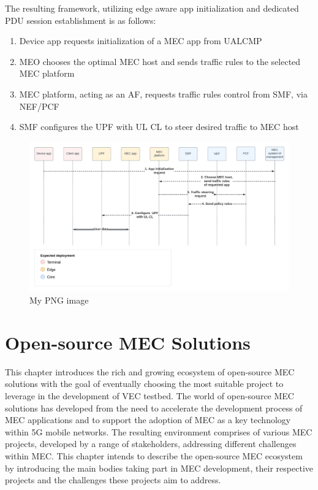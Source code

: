 \documentclass[12pt,a4paper,twoside]{report}
\begin{document}
The resulting framework, utilizing edge aware app initialization and dedicated PDU session establishment is as follows: 
\begin{enumerate}
	\item Device app requests initialization of a MEC app from UALCMP
	\item MEO chooses the optimal MEC host and sends traffic rules to the selected MEC platform
	\item MEC platform, acting as an AF, requests traffic rules control from SMF, via NEF/PCF 
	\item SMF configures the UPF with UL CL to steer desired traffic to MEC host
\end{enumerate}

\begin{figure}[ht]
	\centering
	\includegraphics[width=\textwidth]{./images/MEC-5G-integration-flowchart.png}
	\caption{My PNG image}
\end{figure}

\chapter{Open-source MEC Solutions}
\label{ch:o-sMEC}
This chapter introduces the rich and growing ecosystem of open-source MEC solutions with the goal of eventually choosing the most suitable project to leverage in the development of VEC testbed. The world of open-source MEC solutions has developed from the need to accelerate the development process of MEC applications and to support the adoption of MEC as a key technology within 5G mobile networks. The resulting environment comprises of various MEC projects, developed by a range of stakeholders, addressing different challenges within MEC. This chapter intends to describe the open-source MEC ecosystem by introducing the main bodies taking part in MEC development, their respective projects and the challenges these projects aim to address. 
\end{document}
